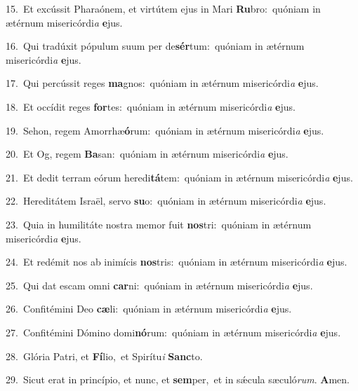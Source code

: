 {\numbfont\textcolor{\numbcolor}{15.}}~Et excússit Pharaónem, et virtútem ejus in Mari \textbf{Ru}\-bro:~\star quóniam in ætérnum misericórdi\textit{a} \textbf{e}\-jus.\par
{\numbfont\textcolor{\numbcolor}{16.}}~Qui tradúxit pópulum suum per de\-\textbf{sér}\-tum:~\star quóniam in ætérnum misericórdi\textit{a} \textbf{e}\-jus.\par
{\numbfont\textcolor{\numbcolor}{17.}}~Qui percússit reges \textbf{ma}\-gnos:~\star quóniam in ætérnum misericórdi\textit{a} \textbf{e}\-jus.\par
{\numbfont\textcolor{\numbcolor}{18.}}~Et occídit reges \textbf{for}\-tes:~\star quóniam in ætérnum misericórdi\textit{a} \textbf{e}\-jus.\par
{\numbfont\textcolor{\numbcolor}{19.}}~Sehon, regem Amorrhæ\-\textbf{ó}\-rum:~\star quóniam in ætérnum misericórdi\textit{a} \textbf{e}\-jus.\par
{\numbfont\textcolor{\numbcolor}{20.}}~Et Og, regem \textbf{Ba}\-san:~\star quóniam in ætérnum misericórdi\textit{a} \textbf{e}\-jus.\par
{\numbfont\textcolor{\numbcolor}{21.}}~Et dedit terram eórum heredi\-\textbf{tá}\-tem:~\star quóniam in ætérnum misericórdi\textit{a} \textbf{e}\-jus.\par
{\numbfont\textcolor{\numbcolor}{22.}}~Hereditátem Israël, servo \textbf{su}\-o:~\star quóniam in ætérnum misericórdi\textit{a} \textbf{e}\-jus.\par
{\numbfont\textcolor{\numbcolor}{23.}}~Quia in humilitáte nostra memor fuit \textbf{nos}\-tri:~\star quóniam in ætérnum misericórdi\textit{a} \textbf{e}\-jus.\par
{\numbfont\textcolor{\numbcolor}{24.}}~Et redémit nos ab inimícis \textbf{nos}\-tris:~\star quóniam in ætérnum misericórdi\textit{a} \textbf{e}\-jus.\par
{\numbfont\textcolor{\numbcolor}{25.}}~Qui dat escam omni \textbf{car}\-ni:~\star quóniam in ætérnum misericórdi\textit{a} \textbf{e}\-jus.\par
{\numbfont\textcolor{\numbcolor}{26.}}~Confitémini Deo \textbf{cæ}\-li:~\star quóniam in ætérnum misericórdi\textit{a} \textbf{e}\-jus.\par
{\numbfont\textcolor{\numbcolor}{27.}}~Confitémini Dómino domi\-\textbf{nó}\-rum:~\star quóniam in ætérnum misericórdi\textit{a} \textbf{e}\-jus.\par
{\numbfont\textcolor{\numbcolor}{28.}}~Glória Patri, et \textbf{Fí}\-lio,~\star et Spirítu\textit{i} \textbf{Sanc}\-to.\par
{\numbfont\textcolor{\numbcolor}{29.}}~Sicut erat in princípio, et nunc, et \textbf{sem}\-per,~\star et in sǽcula sæculó\-\textit{rum}\-. \textbf{A}\-men.\par
